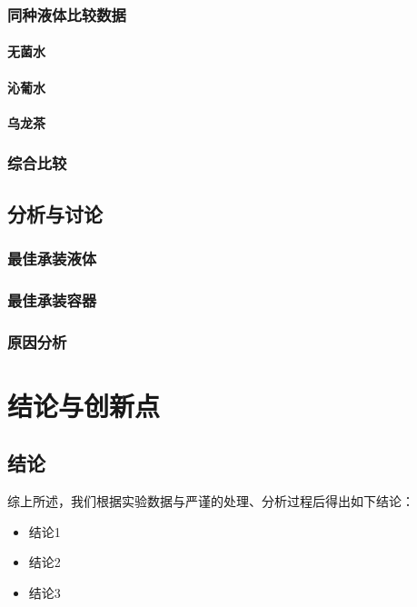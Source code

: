 \documentclass[12pt,a4paper]{ctexart}
\begin{document}
\subsubsection{同种液体比较数据}
\paragraph{无菌水}

\paragraph{沁葡水}

\paragraph{乌龙茶}

\subsubsection{综合比较}

\subsection{分析与讨论}
\subsubsection{最佳承装液体}

\subsubsection{最佳承装容器}

\subsubsection{原因分析}

\section{结论与创新点}
\subsection{结论}
综上所述，我们根据实验数据与严谨的处理、分析过程后得出如下结论：
\begin{itemize}
    \item 结论1
    \item 结论2
    \item 结论3
\end{itemize}
\end{document}
